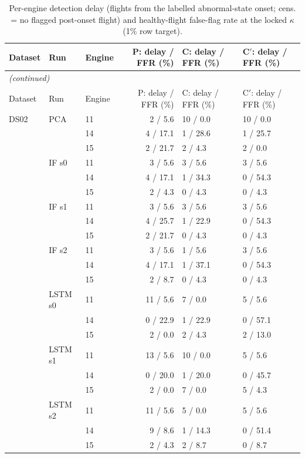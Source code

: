 \begin{scriptsize}
\begin{longtable}{lllrll}
\caption{Per-engine detection delay (flights from the labelled abnormal-state onset; cens. = no flagged post-onset flight) and healthy-flight false-flag rate at the locked $\kappa$ (1\% row target).}\label{tab:s15_delays}\\
\toprule
Dataset & Run & Engine & P: delay / FFR (\%) & C: delay / FFR (\%) & C$'$: delay / FFR (\%) \\
\midrule
\endfirsthead
\multicolumn{6}{l}{\emph{(continued)}}\\
\toprule
Dataset & Run & Engine & P: delay / FFR (\%) & C: delay / FFR (\%) & C$'$: delay / FFR (\%) \\
\midrule
\endhead
\bottomrule
\endfoot
DS02 & PCA & 11 & 2 / 5.6 & 10 / 0.0 & 10 / 0.0 \\
 &  & 14 & 4 / 17.1 & 1 / 28.6 & 1 / 25.7 \\
 &  & 15 & 2 / 21.7 & 2 / 4.3 & 2 / 0.0 \\
 & IF s0 & 11 & 3 / 5.6 & 3 / 5.6 & 3 / 5.6 \\
 &  & 14 & 4 / 17.1 & 1 / 34.3 & 0 / 54.3 \\
 &  & 15 & 2 / 4.3 & 0 / 4.3 & 0 / 4.3 \\
 & IF s1 & 11 & 3 / 5.6 & 3 / 5.6 & 3 / 5.6 \\
 &  & 14 & 4 / 25.7 & 1 / 22.9 & 0 / 54.3 \\
 &  & 15 & 2 / 21.7 & 0 / 4.3 & 0 / 4.3 \\
 & IF s2 & 11 & 3 / 5.6 & 1 / 5.6 & 3 / 5.6 \\
 &  & 14 & 4 / 17.1 & 1 / 37.1 & 0 / 54.3 \\
 &  & 15 & 2 / 8.7 & 0 / 4.3 & 0 / 4.3 \\
 & LSTM s0 & 11 & 11 / 5.6 & 7 / 0.0 & 5 / 5.6 \\
 &  & 14 & 0 / 22.9 & 1 / 22.9 & 0 / 57.1 \\
 &  & 15 & 2 / 0.0 & 2 / 4.3 & 2 / 13.0 \\
 & LSTM s1 & 11 & 13 / 5.6 & 10 / 0.0 & 5 / 5.6 \\
 &  & 14 & 0 / 20.0 & 1 / 20.0 & 0 / 45.7 \\
 &  & 15 & 2 / 0.0 & 7 / 0.0 & 5 / 4.3 \\
 & LSTM s2 & 11 & 11 / 5.6 & 5 / 0.0 & 5 / 5.6 \\
 &  & 14 & 9 / 8.6 & 1 / 14.3 & 0 / 51.4 \\
 &  & 15 & 2 / 4.3 & 2 / 8.7 & 0 / 8.7 \\

\end{longtable}
\end{scriptsize}
